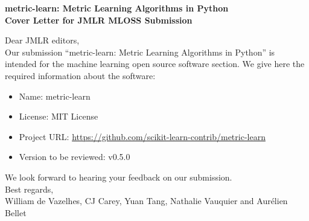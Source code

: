 \documentclass[a4paper]{article}
\begin{document}
\begin{center}
{\Large \bf metric-learn: Metric Learning Algorithms in Python\\\vspace{.5cm}Cover Letter for JMLR MLOSS Submission}
\vspace{1cm}
\end{center}

Dear JMLR editors,\\

Our submission ``metric-learn: Metric Learning Algorithms in Python'' is intended for the machine learning open source software section. We give here the required information about the software:
\begin{itemize}
    \item Name: metric-learn
    \item License: MIT License
    \item Project URL: \url{https://github.com/scikit-learn-contrib/metric-learn}
    \item Version to be reviewed: v0.5.0\\
\end{itemize}

We look forward to hearing your feedback on our submission.\\

Best regards,\\

William de Vazelhes, CJ Carey, Yuan Tang, Nathalie Vauquier and Aur\'elien Bellet
\end{document}
